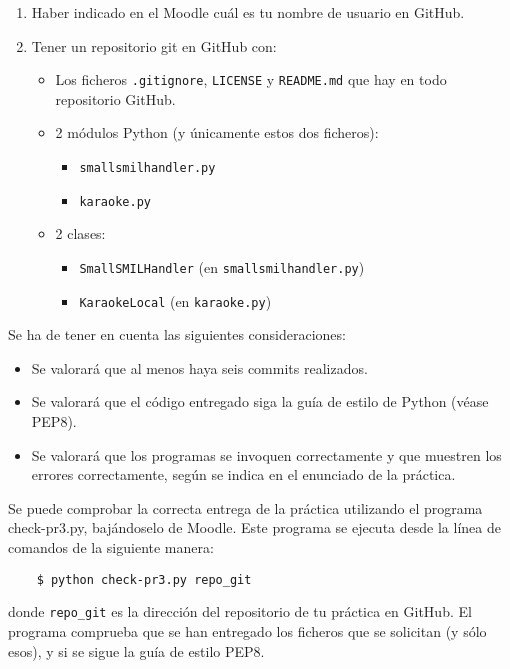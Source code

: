 \documentclass[11pt,a4paper]{article}
\begin{document}
\begin{enumerate}
  \item Haber indicado en el Moodle cuál es tu nombre de usuario en GitHub.
  \item Tener un repositorio git en GitHub con:
  \begin{itemize}
    \item Los ficheros \texttt{.gitignore}, \texttt{LICENSE} y \texttt{README.md} que hay en todo repositorio GitHub.
    \item 2 módulos Python (y únicamente estos dos ficheros):
    \begin{itemize}
      \item \texttt{smallsmilhandler.py}
      \item \texttt{karaoke.py}
    \end{itemize}
    \item 2 clases:
    \begin{itemize}
      \item \texttt{SmallSMILHandler} (en \texttt{smallsmilhandler.py})
      \item \texttt{KaraokeLocal} (en \texttt{karaoke.py})
    \end{itemize}
  \end{itemize}
\end{enumerate}

Se ha de tener en cuenta las siguientes consideraciones:
\begin{itemize}
  \item Se valorará que al menos haya seis commits realizados.
  \item Se valorará que el código entregado siga la guía de estilo de Python (véase PEP8).
  \item Se valorará que los programas se invoquen correctamente y que muestren los errores correctamente, según se indica en el enunciado de la práctica.
\end{itemize}

Se puede comprobar la correcta entrega de la práctica utilizando el programa check-pr3.py, bajándoselo de Moodle. Este programa se ejecuta desde la línea de comandos de la siguiente manera:
\begin{verbatim}
	$ python check-pr3.py repo_git
\end{verbatim}

donde \texttt{repo\_git} es la dirección del repositorio de tu práctica en GitHub. El programa comprueba que se han entregado los ficheros que se solicitan (y sólo esos), y si se sigue la guía de estilo PEP8. 




\end{document}

